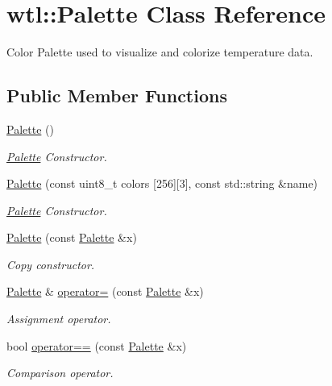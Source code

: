\hypertarget{classwtl_1_1_palette}{}\section{wtl\+:\+:Palette Class Reference}
\label{classwtl_1_1_palette}


Color Palette used to visualize and colorize temperature data.  


\subsection*{Public Member Functions}
\begin{DoxyCompactItemize}
\item 
\hyperlink{classwtl_1_1_palette_a2f21d53e90f3f40124b9733d22caa7cc}{Palette} ()
\begin{DoxyCompactList}\small\item\em \hyperlink{classwtl_1_1_palette}{Palette} Constructor. \end{DoxyCompactList}\item 
\hyperlink{classwtl_1_1_palette_a2eff6c10703b35c0ec6329484e4bea7b}{Palette} (const uint8\+\_\+t colors \mbox{[}256\mbox{]}\mbox{[}3\mbox{]}, const std\+::string \&name)
\begin{DoxyCompactList}\small\item\em \hyperlink{classwtl_1_1_palette}{Palette} Constructor. \end{DoxyCompactList}\item 
\hyperlink{classwtl_1_1_palette_af7193734230ccde8a33e9ad07f035e98}{Palette} (const \hyperlink{classwtl_1_1_palette}{Palette} \&x)
\begin{DoxyCompactList}\small\item\em Copy constructor. \end{DoxyCompactList}\item 
\hyperlink{classwtl_1_1_palette}{Palette} \& \hyperlink{classwtl_1_1_palette_a9f5a50d8074f6a6bab338c9624771d2d}{operator=} (const \hyperlink{classwtl_1_1_palette}{Palette} \&x)
\begin{DoxyCompactList}\small\item\em Assignment operator. \end{DoxyCompactList}\item 
bool \hyperlink{classwtl_1_1_palette_a5d98b8f496d440b3cc2e3e5f4ee8ddc8}{operator==} (const \hyperlink{classwtl_1_1_palette}{Palette} \&x)
\begin{DoxyCompactList}\small\item\em Comparison operator. \end{DoxyCompactList}\item 

\end{DoxyCompactItemize}
